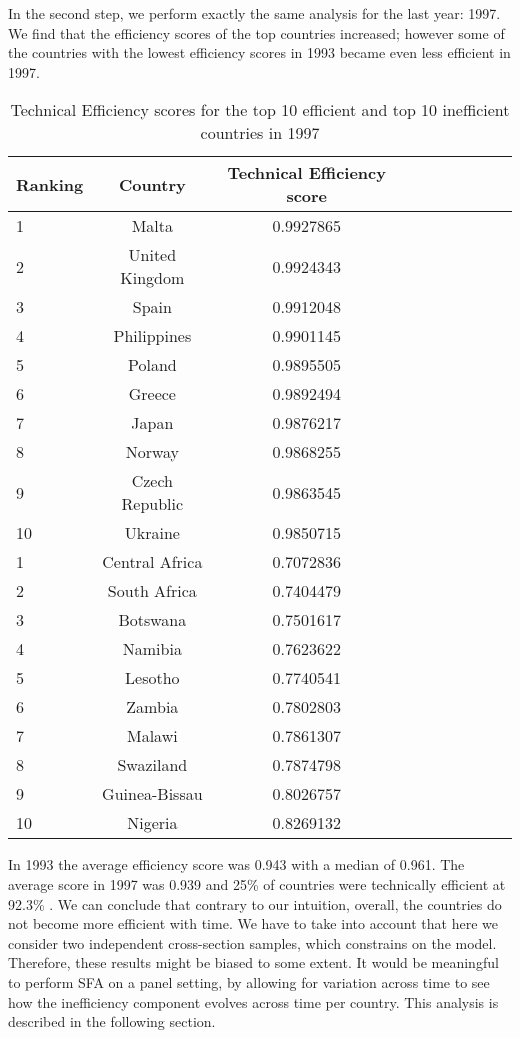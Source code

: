 \documentclass[12pt,a4paper]{article}\usepackage[]{graphicx}\usepackage[]{color}
\begin{document}
In the second step, we perform exactly the same analysis for the last year: 1997. We find that the efficiency scores of the top countries increased; however some of the countries with the lowest efficiency scores in 1993 became even less efficient in 1997. 

  \begin{table}[H]
\centering

\caption{Technical Efficiency scores for the top 10 efficient and top 10 inefficient countries in 1997 }
\begin{tabular}{lccccccccc}
  \hline
Ranking &  Country & Technical Efficiency score\\ 
 
  \hline \hline
   1 & Malta & 0.9927865\\ 
   2 & United Kingdom & 0.9924343   \\ 
   3 & Spain &  0.9912048 \\ 
   4 & Philippines&   0.9901145    \\ 
   5 & Poland &  0.9895505 \\ 
   6 & Greece & 0.9892494\\
   7 & Japan & 0.9876217 \\
   8 & Norway  & 0.9868255 \\
   9 & Czech Republic & 0.9863545 \\
   10 & Ukraine & 0.9850715\\
  \hline
   1 & Central Africa& 0.7072836 \\ 
   2 & South Africa & 0.7404479\\ 
   3 & Botswana &  0.7501617\\ 
   4 & Namibia&   0.7623622  \\ 
   5 & Lesotho &  0.7740541 \\ 
   6 & Zambia & 0.7802803\\
   7 & Malawi & 0.7861307\\
   8 & Swaziland  & 0.7874798 \\
   9 & Guinea-Bissau & 0.8026757 \\
   10 & Nigeria & 0.8269132 \\
   \hline \hline
\end{tabular}

\end{table}

In 1993 the average efficiency score was 0.943 with a median of 0.961. The average  score in 1997 was 0.939 and 25\% of countries were technically efficient at 92.3\% . We can conclude that contrary to our intuition, overall, the countries do not become more efficient with time. 
We have to take into account that here we consider two independent cross-section samples, which constrains on the model. Therefore, these results might be biased to some extent. It would be meaningful to perform SFA on a panel setting, by allowing for variation across time to see how the inefficiency component evolves across time per country. This analysis is described in the following section.
\end{document}

